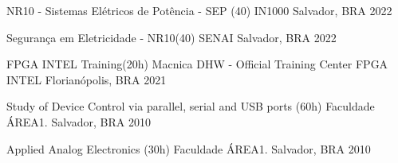 

\begin{cvhonors}
\cvhonor
  {NR10 - Sistemas Elétricos de Potência - SEP (40)} %
  {IN1000} %
  {Salvador, BRA} %
  {2022} %

\cvhonor
  {Segurança em Eletricidade - NR10(40)} %
  {SENAI} %
  {Salvador, BRA} %
  {2022} %

\cvhonor
  {FPGA INTEL Training(20h)} %
  {Macnica DHW - Official Training Center FPGA INTEL} %
  {Florianópolis, BRA} %
  {2021} %

    

\cvhonor
  {Study of Device Control via parallel, serial and USB ports (60h)} %
  {Faculdade ÁREA1.} %
  {Salvador, BRA} %
  {2010} %

\cvhonor
  {Applied Analog Electronics (30h)} %
  {Faculdade ÁREA1.} %
  {Salvador, BRA} %
  {2010} %

\end{cvhonors}
